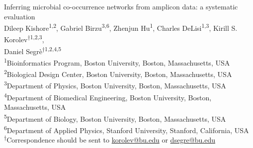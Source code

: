 
\begin{titlepage}

  \newcommand{\HRule}{\rule{\linewidth}{0.5mm}} %

  \center %





  \vspace*{\fill}
  {\huge Inferring microbial co-occurrence networks from amplicon data: a systematic evaluation}\\[0.4cm]


  \vspace{1.5 cm}
  Dileep Kishore\textsuperscript{1,2},
  Gabriel Birzu\textsuperscript{3,6},
  Zhenjun Hu\textsuperscript{1},
  Charles DeLisi\textsuperscript{1,3},
  Kirill S. Korolev\textsuperscript{$\dagger$1,2,3},\\
  Daniel Segr\`{e}\textsuperscript{$\dagger$1,2,4,5}\\
  \vspace{1cm}
  \textsuperscript{1}Bioinformatics Program, Boston University, Boston, Massachusetts, USA\\
  \textsuperscript{2}Biological Design Center, Boston University, Boston, Massachusetts, USA\\
  \textsuperscript{3}Department of Physics, Boston University, Boston, Massachusetts, USA\\
  \textsuperscript{4}Department of Biomedical Engineering, Boston University, Boston, Massachusetts, USA\\
  \textsuperscript{5}Department of Biology, Boston University, Boston, Massachusetts, USA\\
  \textsuperscript{6}Department of Applied Physics, Stanford University, Stanford, California, USA\\
  \textsuperscript{$\dagger$}Correspondence should be sent to \href{mailto:korolev@bu.edu}{korolev@bu.edu} or \href{mailto:dsegre@bu.edu}{dsegre@bu.edu}\\


\end{titlepage}
